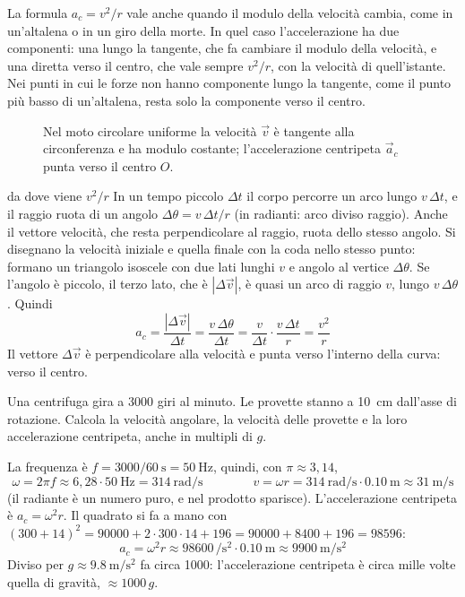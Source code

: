 La formula $a_c = v^2/r$ vale anche quando il modulo della velocità cambia, come in un'altalena o in un giro della morte. In quel caso l'accelerazione ha due componenti: una lungo la tangente, che fa cambiare il modulo della velocità, e una diretta verso il centro, che vale sempre $v^2/r$, con la velocità di quell'istante. Nei punti in cui le forze non hanno componente lungo la tangente, come il punto più basso di un'altalena, resta solo la componente verso il centro.

\begin{figure}[h]
\centering

\caption{Nel moto circolare uniforme la velocità $\vec v$ è tangente alla circonferenza e ha modulo costante; l'accelerazione centripeta $\vec a_c$ punta verso il centro $O$.}
\label{fig:ud2-circolare}
\end{figure}

\begin{approfondimento}{da dove viene $v^2/r$}
In un tempo piccolo $\Delta t$ il corpo percorre un arco lungo $v\,\Delta t$, e il raggio ruota di un angolo $\Delta\theta = v\,\Delta t/r$ (in radianti: arco diviso raggio). Anche il vettore velocità, che resta perpendicolare al raggio, ruota dello stesso angolo. Si disegnano la velocità iniziale e quella finale con la coda nello stesso punto: formano un triangolo isoscele con due lati lunghi $v$ e angolo al vertice $\Delta\theta$. Se l'angolo è piccolo, il terzo lato, che è $|\Delta\vec v|$, è quasi un arco di raggio $v$, lungo $v\,\Delta\theta$. Quindi
\[
  a_c = \frac{|\Delta\vec v|}{\Delta t} = \frac{v\,\Delta\theta}{\Delta t} = \frac{v}{\Delta t} \cdot \frac{v\,\Delta t}{r} = \frac{v^2}{r}
\]
Il vettore $\Delta\vec v$ è perpendicolare alla velocità e punta verso l'interno della curva: verso il centro.
\end{approfondimento}

\begin{esempio}
Una centrifuga gira a \num{3000} giri al minuto. Le provette stanno a \SI{10}{\centi\metre} dall'asse di rotazione. Calcola la velocità angolare, la velocità delle provette e la loro accelerazione centripeta, anche in multipli di $g$.

La frequenza è $f = 3000/\SI{60}{\second} = \SI{50}{\hertz}$, quindi, con $\pi \approx 3{,}14$,
\[
  \omega = 2\pi f \approx 6{,}28 \cdot \SI{50}{\hertz} = \SI{314}{\radian\per\second}
  \qquad\qquad
  v = \omega r = \SI{314}{\radian\per\second} \cdot \SI{0,10}{\metre} \approx \SI{31}{\metre\per\second}
\]
(il radiante è un numero puro, e nel prodotto sparisce). L'accelerazione centripeta è $a_c = \omega^2 r$. Il quadrato si fa a mano con $(300 + 14)^2 = \num{90000} + 2 \cdot 300 \cdot 14 + 196 = \num{90000} + \num{8400} + 196 = \num{98596}$:
\[
  a_c = \omega^2 r \approx \num{98600}\,\si{\per\second\squared} \cdot \SI{0,10}{\metre} \approx \SI{9900}{\metre\per\second\squared}
\]
Diviso per $g \approx \SI{9,8}{\metre\per\second\squared}$ fa circa \num{1000}: l'accelerazione centripeta è circa mille volte quella di gravità, $\approx 1000\,g$.
\end{esempio}

